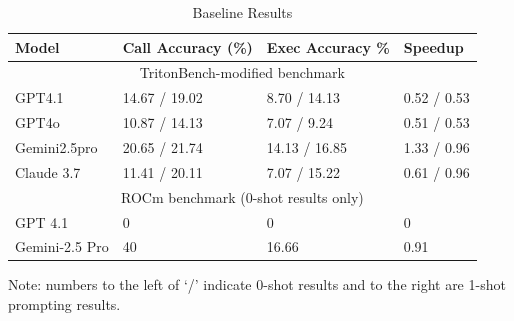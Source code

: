 \begin{table}
 \caption{Baseline Results}
  \centering
  \begin{threeparttable}
  \begin{tabular}{llll}
    \toprule
    Model     & Call Accuracy (\%)     & Exec Accuracy {\%} & Speedup \\
    \midrule
    \multicolumn{4}{c}{TritonBench-modified benchmark}                   \\
    \midrule
    GPT4.1 & 14.67 / 19.02  &  8.70 / 14.13  & 0.52 / 0.53    \\
    GPT4o     &  10.87 / 14.13  & 7.07 / 9.24 & 0.51 / 0.53      \\
    Gemini2.5pro     & 20.65 / 21.74       & 14.13 / 16.85 & 1.33 / 0.96  \\
    Claude 3.7  & 11.41 / 20.11 & 7.07 / 15.22 & 0.61 / 0.96 \\
    \midrule
    \multicolumn{4}{c}{ROCm benchmark (0-shot results only) } \\
    \midrule
    GPT 4.1 & 0 & 0 & 0 \\
    Gemini-2.5 Pro & 40 & 16.66 & 0.91 \\
    \bottomrule
  \end{tabular}
  \label{tab:baselines}
  \begin{tablenotes}
  \small
\item Note:  numbers to the left of ‘/’ indicate 0-shot results and to the right are 1-shot prompting results.
\end{tablenotes}
  \end{threeparttable}
\end{table}